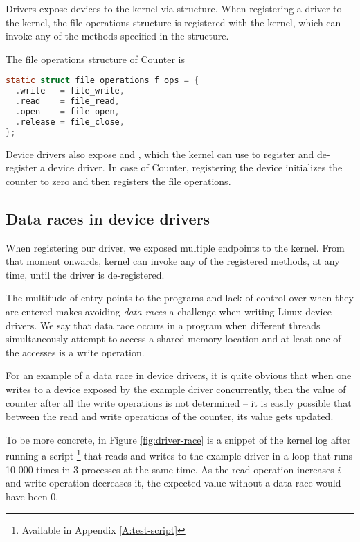 \documentclass[..thesis.tex]{subfiles}
\begin{document}
Drivers expose devices to the kernel via  structure. When registering a driver to the kernel,
the file operations structure is registered with the kernel, which can invoke any of the methods specified in the structure.

The file operations structure of Counter is 

\begin{lstlisting}[language=c,style=def]
static struct file_operations f_ops = {
  .write   = file_write,
  .read    = file_read,
  .open    = file_open,
  .release = file_close,
};
\end{lstlisting}

Device drivers also expose  and , which the kernel can use to register and de-register a device driver. In case of Counter,
registering the device initializes the counter  to zero and then registers the file operations. 

\subsection{Data races in device drivers}

When registering our driver, we exposed multiple endpoints to the kernel. From that moment onwards, kernel can invoke any of the registered methods,
at any time, until the driver is de-registered. 


The multitude of entry points to the programs and lack of control over when they are entered makes avoiding \textit{data races} a challenge when writing Linux device drivers.
We say that data race occurs in a program when different threads simultaneously attempt to access a shared memory location and at least one of the accesses is a
write operation.

For an example of a data race in device drivers, it is quite obvious that when one writes to a device exposed by the example driver concurrently,
then the value of counter after all the write operations is not determined -- it is easily possible that between the read and write operations of the counter, its value gets updated.

To be more concrete, in Figure \ref{fig:driver-race} is a snippet of the kernel log after running a script \footnote{Available in Appendix \ref{A:test-script}}
that reads and writes to the example driver in a loop that runs 10 000 times in 3 processes at the same time.
As the read operation increases $i$ and write operation decreases it, the expected value without a data race would have been $0$.
\end{document}
